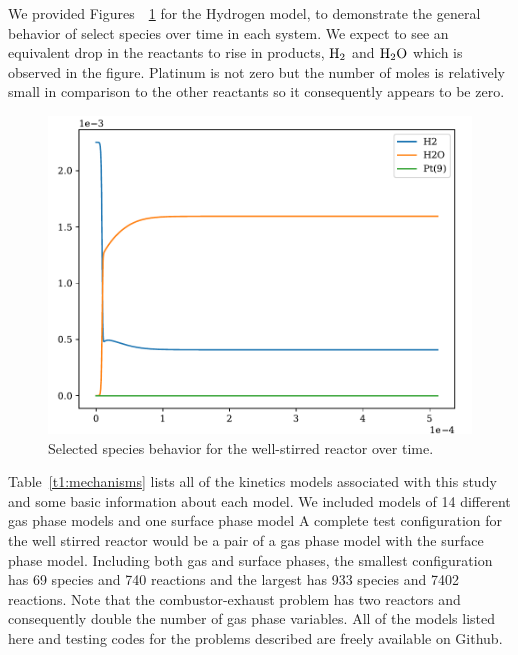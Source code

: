 \documentclass{article}
\begin{document}
We provided Figures~~\ref{fig:wsr} for the Hydrogen model, to demonstrate the general behavior of select species over time in each system.
We expect to see an equivalent drop in the reactants to rise in products, $\ce{H2}$ and $\ce{H2O}$ which is observed in the figure.
Platinum is not zero but the number of moles is relatively small in comparison to the other reactants so it consequently appears to be zero.
\begin{figure}[htb]
    \centering
    \includegraphics[scale=0.8]{figures/PlatinumLargeHydrogen_0_well_stirred_reactor.pdf}
    \caption{Selected species behavior for the well-stirred reactor over time.}
    \label{fig:wsr}
\end{figure}

Table~\ref{t1:mechanisms} lists all of the kinetics models associated with this study and some basic information about each model.
We included models of 14 different gas phase models and one surface phase model
A complete test configuration for the well stirred reactor would be a pair of a gas phase model with the surface phase model.
Including both gas and surface phases, the smallest configuration has 69 species and 740 reactions and the largest has 933 species and 7402 reactions.
Note that the combustor-exhaust problem has two reactors and consequently double the number of gas phase variables.
All of the models listed here and testing codes for the problems described are freely available on Github\cite{testing_package}.
\end{document}
